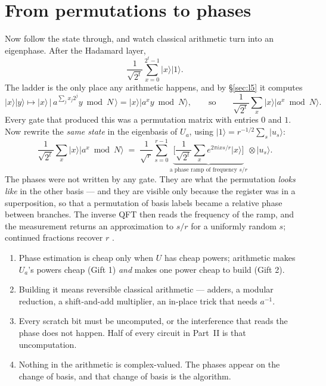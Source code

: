 \documentclass[11pt]{article}
\renewcommand{\ket}[1]{\lvert #1 \rangle}
\theoremstyle{plain}
\theoremstyle{remark}
\begin{document}
\section{From permutations to phases}

Now follow the state through, and watch classical arithmetic turn into an eigenphase. After the
Hadamard layer,
\[
\frac1{\sqrt{2^t}}\sum_{x=0}^{2^t-1}\ket x\ket1 .
\]
The ladder is the only place any arithmetic happens, and by \S\ref{sec:l5} it computes
\[
\ket x\ket y\longmapsto\ket x\,\big|\,a^{\sum_jx_j2^j}y\bmod N\,\big\rangle=\ket x\ket{a^xy\bmod N},
\qquad\text{so}\qquad
\frac1{\sqrt{2^t}}\sum_x\ket x\ket{a^x\bmod N}.
\]
Every gate that produced this was a permutation matrix with entries $0$ and $1$. Now rewrite the
\emph{same state} in the eigenbasis of $U_a$, using $\ket1=r^{-1/2}\sum_s\ket{u_s}$:
\[
\frac1{\sqrt{2^t}}\sum_x\ket x\ket{a^x\bmod N}
\;=\;
\frac1{\sqrt r}\sum_{s=0}^{r-1}
\underbrace{\Big[\frac1{\sqrt{2^t}}\sum_x e^{2\pi ixs/r}\ket x\Big]}_{\text{a phase ramp of frequency }s/r}
\otimes\ket{u_s}.
\]
The phases were not written by any gate. They are what the permutation \emph{looks like} in the
other basis --- and they are visible only because the register was in a superposition, so that a
permutation of basis labels became a relative phase between branches. The inverse QFT then reads the
frequency of the ramp, and the measurement returns an approximation to $s/r$ for a uniformly random
$s$; continued fractions recover $r$ \cite{shor}.

\begin{keybox}[title={The whole story in four lines}]
\begin{enumerate}\setlength\itemsep{1pt}
\item Phase estimation is cheap only when $U$ has cheap powers; arithmetic makes $U_a$'s powers
cheap (Gift 1) \emph{and} makes one power cheap to build (Gift 2).
\item Building it means reversible classical arithmetic --- adders, a modular reduction, a
shift-and-add multiplier, an in-place trick that needs $a^{-1}$.
\item Every scratch bit must be uncomputed, or the interference that reads the phase does not
happen. Half of every circuit in Part~II is that uncomputation.
\item Nothing in the arithmetic is complex-valued. The phases appear on the change of basis, and
that change of basis is the algorithm.
\end{enumerate}
\end{keybox}
\end{document}

